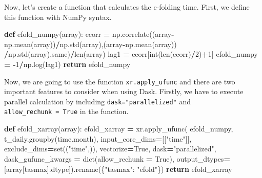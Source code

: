 \documentclass[
]{book}
\newenvironment{Shaded}{\begin{snugshade}}{\end{snugshade}}
\newcommand{\BuiltInTok}[1]{#1}
\newcommand{\ControlFlowTok}[1]{\textcolor[rgb]{0.13,0.29,0.53}{\textbf{#1}}}
\newcommand{\DecValTok}[1]{\textcolor[rgb]{0.00,0.00,0.81}{#1}}
\newcommand{\KeywordTok}[1]{\textcolor[rgb]{0.13,0.29,0.53}{\textbf{#1}}}
\newcommand{\NormalTok}[1]{#1}
\newcommand{\OperatorTok}[1]{\textcolor[rgb]{0.81,0.36,0.00}{\textbf{#1}}}
\newcommand{\StringTok}[1]{\textcolor[rgb]{0.31,0.60,0.02}{#1}}
\newcommand{\VariableTok}[1]{\textcolor[rgb]{0.00,0.00,0.00}{#1}}
\begin{document}
Now, let's create a function that calculates the e-folding time. First, we define this function with NumPy syntax.

\begin{Shaded}
\begin{Highlighting}[]
\KeywordTok{def}\NormalTok{ efold\_numpy(array):}
\NormalTok{    ecorr }\OperatorTok{=}\NormalTok{ np.correlate((array}\OperatorTok{{-}}\NormalTok{np.mean(array))}\OperatorTok{/}\NormalTok{np.std(array),(array}\OperatorTok{{-}}\NormalTok{np.mean(array))}
                         \OperatorTok{/}\NormalTok{np.std(array),}\StringTok{\textquotesingle{}same\textquotesingle{}}\NormalTok{)}\OperatorTok{/}\BuiltInTok{len}\NormalTok{(array)}
\NormalTok{    lag1 }\OperatorTok{=}\NormalTok{ ecorr[}\BuiltInTok{int}\NormalTok{(}\BuiltInTok{len}\NormalTok{(ecorr)}\OperatorTok{/}\DecValTok{2}\NormalTok{)}\OperatorTok{+}\DecValTok{1}\NormalTok{]}
\NormalTok{    efold\_numpy }\OperatorTok{=} \OperatorTok{{-}}\DecValTok{1}\OperatorTok{/}\NormalTok{np.log(lag1)}
    \ControlFlowTok{return}\NormalTok{ efold\_numpy}
\end{Highlighting}
\end{Shaded}

Now, we are going to use the function \texttt{xr.apply\_ufunc} and there are two important features to consider when using Dask. Firstly, we have to execute parallel calculation by including \texttt{dask="parallelized"} and \texttt{allow\_rechunk\ =\ True} in the function.

\begin{Shaded}
\begin{Highlighting}[]
\KeywordTok{def}\NormalTok{ efold\_xarray(array):}
\NormalTok{    efold\_xarray }\OperatorTok{=}\NormalTok{ xr.apply\_ufunc(}
\NormalTok{            efold\_numpy, }
\NormalTok{            t\_daily.groupby(}\StringTok{\textquotesingle{}time.month\textquotesingle{}}\NormalTok{), }
\NormalTok{            input\_core\_dims}\OperatorTok{=}\NormalTok{[[}\StringTok{"time"}\NormalTok{]],  }
\NormalTok{            exclude\_dims}\OperatorTok{=}\BuiltInTok{set}\NormalTok{((}\StringTok{"time"}\NormalTok{,)),}
\NormalTok{            vectorize}\OperatorTok{=}\VariableTok{True}\NormalTok{,  }
\NormalTok{            dask}\OperatorTok{=}\StringTok{"parallelized"}\NormalTok{,}
\NormalTok{            dask\_gufunc\_kwargs }\OperatorTok{=} \BuiltInTok{dict}\NormalTok{(allow\_rechunk }\OperatorTok{=} \VariableTok{True}\NormalTok{),}
\NormalTok{            output\_dtypes}\OperatorTok{=}\NormalTok{[array[}\StringTok{\textquotesingle{}tasmax\textquotesingle{}}\NormalTok{].dtype]).rename(\{}\StringTok{"tasmax"}\NormalTok{: }\StringTok{"efold"}\NormalTok{\})}
    \ControlFlowTok{return}\NormalTok{ efold\_xarray}
\end{Highlighting}
\end{Shaded}
\end{document}

